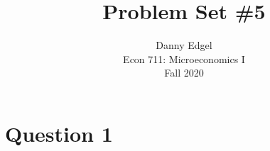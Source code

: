 \documentclass{article}
\begin{document}
\title{	Problem Set \#5 }
\author{ 	Danny Edgel 					\\ 
			Econ 711: Microeconomics I		\\
			Fall 2020						\\
		}
\maketitle\thispagestyle{empty}



\section*{Question 1}
\end{document}
